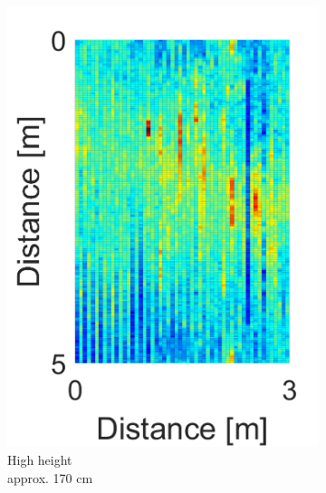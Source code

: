 \begin{figure}[H]
\begin{subfigure}[b]{0.29\textwidth}
\includegraphics[width=\textwidth]{figures/Not_Norm_space_3.png}
\caption{High height \\ approx. 170 cm}
\label{Not_norm_high}
\end{subfigure}
\begin{subfigure}[b]{0.1\textwidth}

\end{subfigure}
\end{figure}
